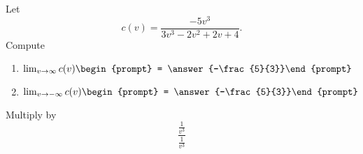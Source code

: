 \documentclass{ximera}
\author{Bart Snapp}
\begin{document}
\begin{exercise}
Let 
\[
c(v) = \frac{-5 v^3}{3 v^3-2 v^2+2 v+4}.
\]
Compute
\begin{enumerate}
\item $\lim_{v\to \infty} c(v) \begin{prompt} = \answer{-\frac{5}{3}}\end{prompt}$
\item $\lim_{v\to -\infty}c(v) \begin{prompt} = \answer{-\frac{5}{3}}\end{prompt}$
\end{enumerate}
\begin{hint}
Multiply by
\[
\frac{\frac{1}{v^3}}{\frac{1}{v^3}}
\]
\end{hint}
\end{exercise}
\end{document}
